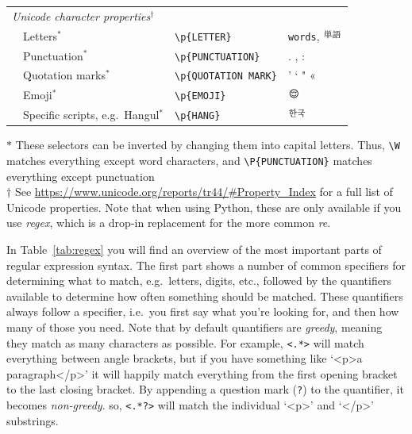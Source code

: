 \begin{table}
{\begin{tabularx}{\textwidth}{lllll}
\multicolumn{4}{l}{\textit{Unicode character properties$^\dagger$}} \\
& Letters$^*$ & \multicolumn{2}{l}{\texttt{\small{\textbackslash{}}p\{LETTER\}}} & \texttt{\small{words}}, \includegraphics[height=1em]{chapter09/tango.pdf}\\
& Punctuation$^*$ &\multicolumn{2}{l}{ \texttt{\small{\textbackslash{}}p\{PUNCTUATION\}}} & . , : \\
& Quotation marks$^*$ & \multicolumn{2}{l}{\texttt{\small{\textbackslash{}}p\{QUOTATION MARK\}}} & ' ` " «  \\
& Emoji$^*$ & \multicolumn{2}{l}{\texttt{\small{\textbackslash{}}p\{EMOJI\}}} & \includegraphics[height=1em]{chapter09/emoji.pdf}  \\
& Specific scripts, e.g.\ Hangul$^*$& \multicolumn{2}{l}{\texttt{\small{\textbackslash{}}p\{HANG\}}} & \includegraphics[height=1em]{chapter09/hangul.pdf}\\

    \bottomrule
  \end{tabularx}}{\small
    $*$ These selectors can be inverted by changing them into  capital letters.   Thus, \texttt{\small{\textbackslash W}} matches everything except word characters, and \texttt{\small{\textbackslash{}}P\{PUNCTUATION\}} matches everything except punctuation\\
    $\dagger$ See \url{https://www.unicode.org/reports/tr44/\#Property\_Index} for a full list of Unicode properties. Note that when using Python, these are only available if you use \emph{regex}, which is a drop-in replacement for the more common \emph{re}.}
\end{table}


In Table~\ref{tab:regex} you will find an overview of the most important parts of regular expression syntax.\fnregexnote
 The first part shows a number of common specifiers for determining what to match, e.g.\ letters, digits, etc.,
followed by the quantifiers available to determine how often something should be matched.
These quantifiers always follow a specifier, i.e.\ you first say what you're looking for, and then how many of those you need.
Note that by default quantifiers are \emph{greedy}, meaning they match as many characters as possible.
For example, \verb|<.*>| will match everything between angle brackets, but if you have something like `<p>a paragraph</p>'
it will happily match everything from the first opening bracket to the last closing bracket.
By appending a question mark (\verb|?|) to the quantifier, it becomes \emph{non-greedy}.
so, \verb|<.*?>| will match the individual `<p>' and `</p>' substrings.

